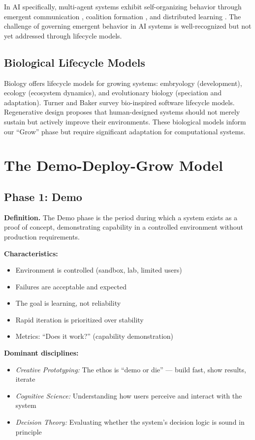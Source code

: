 \documentclass[11pt,a4paper]{article}
\begin{document}
In AI specifically, multi-agent systems exhibit self-organizing behavior through emergent communication \cite{foerster2016}, coalition formation \cite{shehory1998}, and distributed learning \cite{li2020}. The challenge of governing emergent behavior in AI systems is well-recognized \cite{amodei2016} but not yet addressed through lifecycle models.

\subsection{Biological Lifecycle Models}

Biology offers lifecycle models for growing systems: embryology (development), ecology (ecosystem dynamics), and evolutionary biology (speciation and adaptation). Turner and Baker \cite{turner2019} survey bio-inspired software lifecycle models. Regenerative design \cite{mang2012,wahl2016} proposes that human-designed systems should not merely sustain but actively improve their environments. These biological models inform our ``Grow'' phase but require significant adaptation for computational systems.

\section{The Demo-Deploy-Grow Model}

\subsection{Phase 1: Demo}

\textbf{Definition.} The Demo phase is the period during which a system exists as a proof of concept, demonstrating capability in a controlled environment without production requirements.

\textbf{Characteristics:}
\begin{itemize}[nosep]
    \item Environment is controlled (sandbox, lab, limited users)
    \item Failures are acceptable and expected
    \item The goal is learning, not reliability
    \item Rapid iteration is prioritized over stability
    \item Metrics: ``Does it work?'' (capability demonstration)
\end{itemize}

\textbf{Dominant disciplines:}
\begin{itemize}[nosep]
    \item \emph{Creative Prototyping:} The ethos is ``demo or die'' --- build fast, show results, iterate
    \item \emph{Cognitive Science:} Understanding how users perceive and interact with the system
    \item \emph{Decision Theory:} Evaluating whether the system's decision logic is sound in principle
\end{itemize}
\end{document}
